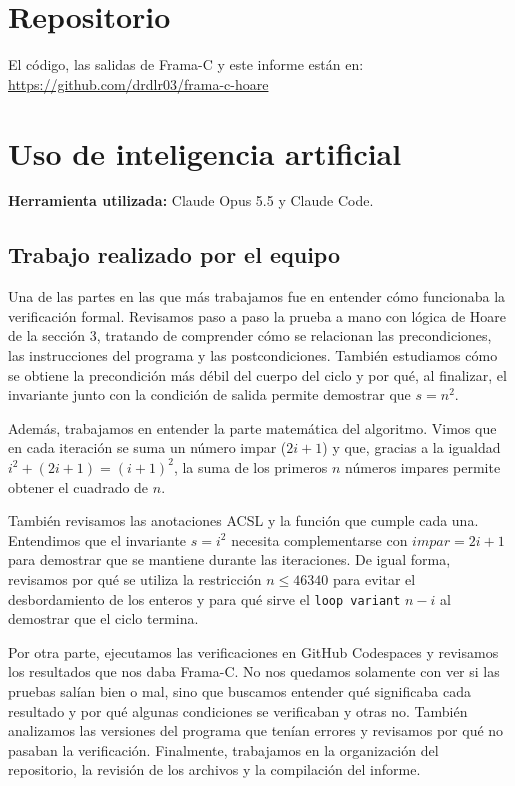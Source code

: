 \documentclass[11pt,letterpaper]{article}
\begin{document}
\section{Repositorio}

El código, las salidas de Frama-C y este informe están en: \url{https://github.com/drdlr03/frama-c-hoare}

\section{Uso de inteligencia artificial}

\textbf{Herramienta utilizada:} Claude Opus 5.5 y Claude Code.

\subsection*{Trabajo realizado por el equipo}

Una de las partes en las que más trabajamos fue en entender cómo funcionaba la verificación formal. Revisamos paso a paso la prueba a mano con lógica de Hoare de la sección 3, tratando de comprender cómo se relacionan las precondiciones, las instrucciones del programa y las postcondiciones. También estudiamos cómo se obtiene la precondición más débil del cuerpo del ciclo y por qué, al finalizar, el invariante junto con la condición de salida permite demostrar que $s = n^2$.

Además, trabajamos en entender la parte matemática del algoritmo. Vimos que en cada iteración se suma un número impar ($2i+1$) y que, gracias a la igualdad $i^2 + (2i+1) = (i+1)^2$, la suma de los primeros $n$ números impares permite obtener el cuadrado de $n$.

También revisamos las anotaciones ACSL y la función que cumple cada una. Entendimos que el invariante $s = i^2$ necesita complementarse con $\mathit{impar} = 2i+1$ para demostrar que se mantiene durante las iteraciones. De igual forma, revisamos por qué se utiliza la restricción $n \leq 46340$ para evitar el desbordamiento de los enteros y para qué sirve el \texttt{loop variant} $n-i$ al demostrar que el ciclo termina.

Por otra parte, ejecutamos las verificaciones en GitHub Codespaces y revisamos los resultados que nos daba Frama-C. No nos quedamos solamente con ver si las pruebas salían bien o mal, sino que buscamos entender qué significaba cada resultado y por qué algunas condiciones se verificaban y otras no. También analizamos las versiones del programa que tenían errores y revisamos por qué no pasaban la verificación. Finalmente, trabajamos en la organización del repositorio, la revisión de los archivos y la compilación del informe.
\end{document}
